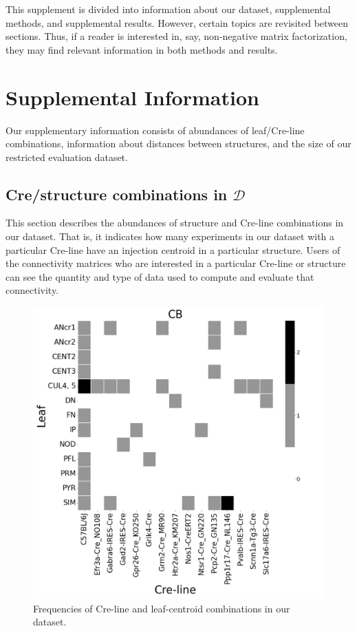 This supplement is divided into information about our dataset, supplemental methods, and supplemental results.
However, certain topics are revisited between sections.
Thus, if a reader is interested in, say, non-negative matrix factorization, they may find relevant information in both methods and results.

\section{Supplemental Information}
\label{supp_sec:info}

Our supplementary information consists of abundances of leaf/Cre-line combinations, information about distances between structures, and the size of our restricted evaluation dataset.

\subsection{Cre/structure combinations in $\mathcal D$}
\label{supp_sec:data}

This section describes the abundances of structure and Cre-line combinations in our dataset.
That is, it indicates how many experiments in our dataset with a particular Cre-line have an injection centroid in a particular structure.
Users of the connectivity matrices who are interested in a particular Cre-line or structure can see the quantity and type of data used to compute and evaluate that connectivity.

\newpage

\begin{figure}[H]
    \centering
    \includegraphics[width = 7in]{figs/CB centroid density.png}
    \caption{Frequencies of Cre-line and leaf-centroid combinations in our dataset.}
            \label{fig:my_label}
\end{figure}
\newpage

